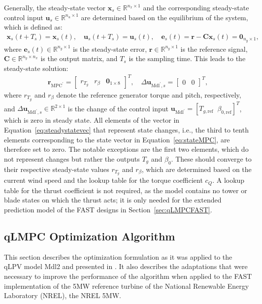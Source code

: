 Generally, the steady-state vector $\bm{x}_{s} \in \mathbb{R}^{n_x \times 1}$ and the corresponding steady-state control input $\bm{u}_{s} \in \mathbb{R}^{n_u \times 1}$ are determined based on the equilibrium of the system, which is defined as:
\begin{align*}
    \bm{x}_{s}(t + T_s) = \bm{x}_{s}(t),  \quad \bm{u}_{s}(t + T_s) = \bm{u}_{s}(t), \quad
    \bm{e}_s(t) = \bm{r} - \bm{C} \bm{x}_{s}(t) = \bm{0}_{n_y \times 1},
\end{align*}
%
where $\bm{e}_s(t) \in \mathbb{R}^{n_y \times 1}$ is the steady-state error, $\bm{r} \in \mathbb{R}^{n_y \times 1}$ is the reference signal, $\bm{C} \in \mathbb{R}^{n_y \times n_x}$ is the output matrix, and $T_s$ is the sampling time. This leads to the steady-state solution:
\begin{align} \label{eq:steadystatevec}
    \bm{r}_{\text{MPC}^\prime} = \begin{bmatrix} r_{T_g} & r_{\beta} & \bm{0}_{1 \times 8} \end{bmatrix}^T, \quad
    \Delta\bm{u}_{\text{Mdl}^\prime\!,s} = \begin{bmatrix} 0 & 0 \end{bmatrix}^T,
\end{align}
where \(r_{T_g}\) and \(r_{\beta}\) denote the reference generator torque and pitch, respectively, and $\Delta\bm{u}_{\text{Mdl}^\prime,s} \in \mathbb{R}^{2 \times 1}$ is the change of the control input $\bm{u}_{\text{Mdl}^\prime} = [T_{g,\text{ref}} \;\; \beta_{0,\text{ref}}]^T$, which is zero in steady state. All elements of the vector in Equation~\eqref{eq:steadystatevec} that represent state changes, i.e., the third to tenth elements corresponding to the state vector in Equation~\eqref{eq:stateMPC}, are therefore set to zero.
The notable exceptions are the first two elements, which do not represent changes but rather the outputs \( T_g \) and \( \beta_0 \). These should converge to their respective steady-state values \( r_{T_g} \) and \( r_{\beta} \), which are determined based on the current wind speed and the lookup table for the torque coefficient $c_Q$. A lookup table for the thrust coefficient is not required, as the model contains no tower or blade states on which the thrust acts; it is only needed for the extended prediction model of the FAST designs in Section~\ref{sec:qLMPCFAST}.

\subsection{qLMPC Optimization Algorithm}\label{sec:qLMPCOptimizationAlgo}
This section describes the optimization formulation as it was applied to the qLPV model Mdl2 and presented in \cite{dittmer2021velocity}. It also describes the adaptations that were necessary to improve the performance of the algorithm when applied to the FAST implementation of the 5MW reference turbine of the National Renewable Energy Laboratory (NREL), the NREL 5MW.

